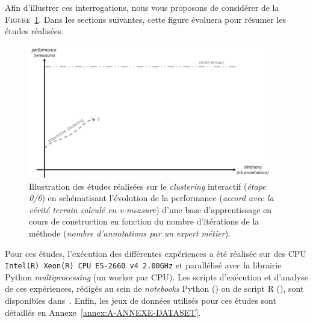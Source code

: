 	Afin d'illustrer ces interrogations, nous vous proposons de considérer de la \textsc{Figure~\ref{figure:4.0-HYPOTHESE-00-DEFAULT}}. Dans les sections suivantes, cette figure évoluera pour résumer les études réalisées.
	\begin{figure}[!htb]
		\centering
		\includegraphics[width=0.95\textwidth]{figures/hypotheses-00-default}
		\caption{
			Illustration des études réalisées sur le \textit{clustering} interactif (\textit{étape 0/6}) en schématisant l'évolution de la performance (\textit{accord avec la vérité terrain calculé en v-measure}) d'une base d'apprentissage en cours de construction en fonction du nombre d'itérations de la méthode (\textit{nombre d'annotations par un expert métier}).
		}
		\label{figure:4.0-HYPOTHESE-00-DEFAULT}
	\end{figure}
	
	
	\begin{leftBarInformation}
		Pour ces études, l'exécution des différentes expériences a été réalisée sur des CPU \texttt{Intel(R) Xeon(R) CPU E5-2660 v4 \@ 2.00GHz} et parallélisé avec la librairie Python \textit{multiprocessing} (un worker par CPU).
		Les scripts d'exécution et d'analyse de ces expériences, rédigés au sein de \textit{notebooks} Python (\cite{van-rossum-drake:2009:python-reference-manual}) ou de script R (\cite{r-core-team:2017:language-environment-statistical}), sont disponibles dans~\cite{schild:2021:cognitivefactory-interactiveclusteringcomparativestudy}.
		Enfin, les jeux de données utilisés pour ces études sont détaillés en Annexe~\ref{annex:A-ANNEXE-DATASET}.
	\end{leftBarInformation}
	
